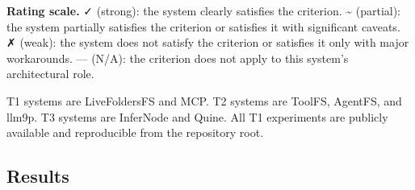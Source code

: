 \documentclass[
  11pt,
]{article}
\begin{document}
\textbf{Rating scale.} ✓ (strong): the system clearly satisfies the
criterion. \textasciitilde{} (partial): the system partially satisfies
the criterion or satisfies it with significant caveats. ✗ (weak): the
system does not satisfy the criterion or satisfies it only with major
workarounds. --- (N/A): the criterion does not apply to this system's
architectural role.

T1 systems are LiveFoldersFS and MCP. T2 systems are ToolFS, AgentFS,
and llm9p. T3 systems are InferNode and Quine. All T1 experiments are
publicly available and reproducible from the repository root.

\hypertarget{results}{%
\subsection{Results}\label{results}}
\end{document}
